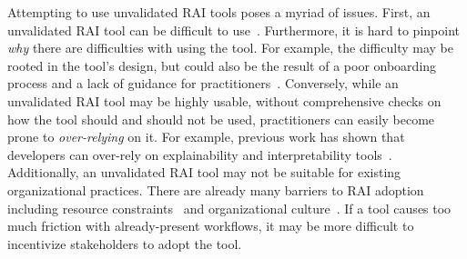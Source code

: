 Attempting to use unvalidated RAI tools poses a myriad of issues.
First, an unvalidated RAI tool can be difficult to use~\cite{lee2021landscape}.
Furthermore, it is hard to pinpoint \emph{why} there are difficulties with using the tool. For example, the difficulty may be rooted in the tool's design, but could also be the result of a poor onboarding process and a lack of guidance for practitioners~\cite{berman2024scoping}.
Conversely, while an unvalidated RAI tool may be highly usable, without comprehensive checks on how the tool should and should not be used, practitioners can easily become prone to \emph{over-relying} on it. For example, previous work has shown that developers can over-rely on explainability and interpretability tools~\cite{kumar2021shapley, kaur2020interpreting}.
Additionally, an unvalidated RAI tool may not be suitable for existing organizational practices.
There are already many barriers to RAI adoption including resource constraints~\cite{berman2024scoping} and organizational culture~\cite{rakova2021responsible, varanasi2023currently}.
If a tool causes too much friction with already-present workflows, it may be more difficult to incentivize stakeholders to adopt the tool.

